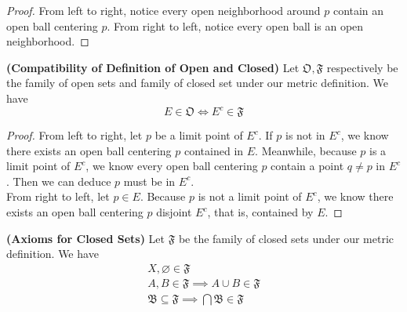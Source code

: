 \documentclass{report}
\begin{document}
\begin{proof}
From left to right, notice every open neighborhood around $p$ contain an open ball centering $p$. From right to left, notice every open ball is an open neighborhood.
\end{proof}
\begin{theorem}
\label{2.4.5}
\textbf{(Compatibility of Definition of Open and Closed)} 
Let $\mathfrak{O},\mathfrak{F}$ respectively be the family of open sets and family of closed set under our metric definition. We have
\begin{equation}
E\in \mathfrak{O}\iff E^c\in\mathfrak{F}
\end{equation}
\end{theorem}
\begin{proof}
From left to right, let $p$ be a limit point of $E^c$. If $p$ is not in $E^c$, we know there exists an open ball centering  $p$ contained in $E$. Meanwhile, because  $p$ is a limit point of $E^c$, we know every open ball centering $p$ contain a point $q\neq p$ in $E^c$. Then we can deduce $p$ must be in $E^c$.\\

From right to left, let $p\in E$. Because $p$ is not a limit point of $E^c$, we know there exists an open ball centering $p$ disjoint $E^c$, that is, contained by  $E$.
\end{proof}
\begin{corollary}
\label{2.4.6}
\textbf{(Axioms for Closed Sets)} Let $\mathfrak{F}$ be the family of closed sets under our metric definition. We have
\begin{gather}
X,\varnothing \in \mathfrak{F}\\
A,B\in\mathfrak{F}\implies A\cup  B\in\mathfrak{F}\\
\mathfrak{B}\subseteq \mathfrak{F}\implies \bigcap \mathfrak{B}\in \mathfrak{F}
\end{gather}
\end{corollary}
\end{document}

